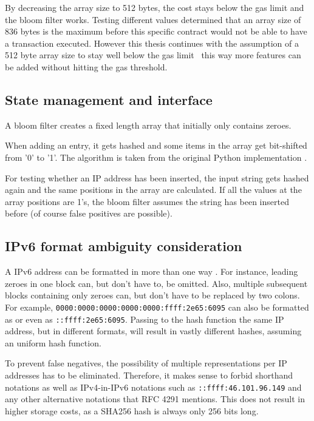By decreasing the array size to 512 bytes, the cost stays below the gas limit and the bloom filter works. 
Testing different values determined that an array size of 836 bytes is the maximum before this specific contract would not be able to have a transaction executed. However this thesis continues with the assumption of a 512 byte array size to stay well below the gas limit \textemdash \ this way more features can be added without hitting the gas threshold.

\subsection{State management and interface}

A bloom filter creates a fixed length array that initially only contains zeroes.


When adding an entry, it gets hashed and some items in the array get bit-shifted from '0' to '1'. The algorithm is taken from the original Python implementation \cite{SimpleBloomFilter}.



For testing whether an IP address has been inserted, the input string gets hashed again and the same positions in the array are calculated. If all the values at the array positions are 1's, the bloom filter assumes the string has been inserted before (of course false positives are possible).




\subsection{IPv6 format ambiguity consideration}

A IPv6 address can be formatted in more than one way \cite{RFC4291I66}. For instance, leading zeroes in one block can, but don't have to, be omitted. Also, multiple subsequent blocks containing only zeroes can, but don't have to be replaced by two colons.
For example, \texttt{0000:0000:0000:0000:0000:ffff:2e65:6095} can also be formatted as
 or even as \texttt{::ffff:2e65:6095}. Passing to the hash function the same IP address, but in different formats, will result in vastly different hashes, assuming an uniform hash function.

To prevent false negatives, the possibility of multiple representations per IP addresses has to be eliminated. Therefore, it makes sense to forbid shorthand notations as well as IPv4-in-IPv6 notations such as \texttt{::ffff:46.101.96.149} and any other alternative notations that RFC 4291 \cite{RFC4291I66} mentions.
This does not result in higher storage costs, as a SHA256 hash is always only 256 bits long.

